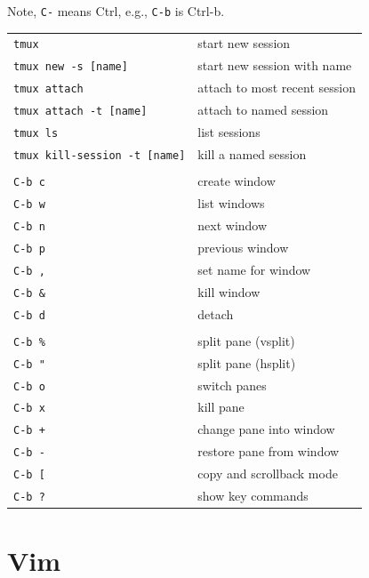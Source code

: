 \documentclass[10pt,twoside,openright]{memoir}
\begin{document}
{\footnotesize

Note, \texttt{C-} means Ctrl, e.g., \texttt{C-b} is Ctrl-b.

\vskip 0.2in

\noindent \begin{tabular}{ll}
\texttt{tmux} & start new session \\
\texttt{tmux new -s [name]} & start new session with name \\
\texttt{tmux attach} & attach to most recent session \\
\texttt{tmux attach -t [name]} & attach to named session \\
\texttt{tmux ls} & list sessions \\
\texttt{tmux kill-session -t [name]} & kill a named session \\
& \\
\texttt{C-b c} & create window \\
\texttt{C-b w} & list windows \\
\texttt{C-b n} & next window \\
\texttt{C-b p} & previous window \\
\texttt{C-b ,} & set name for window \\
\texttt{C-b \&} & kill window \\
\texttt{C-b d} & detach \\
& \\
\texttt{C-b \%} & split pane (vsplit) \\
\texttt{C-b "} & split pane (hsplit) \\
\texttt{C-b o} & switch panes \\
\texttt{C-b x} & kill pane \\
\texttt{C-b +} & change pane into window \\
\texttt{C-b -} & restore pane from window \\
\texttt{C-b [} & copy and scrollback mode \\
\texttt{C-b ?} & show key commands \\
\end{tabular}
}


\chapter{Vim}
\end{document}
